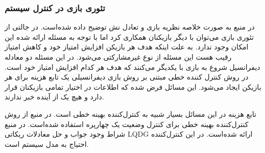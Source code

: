 \subsubsection{تئوری بازی در کنترل سیستم}
در منبع \cite{article1} به صورت خلاصه نظریه بازی و تعادل نش توضیح داده شده‌است. در جالتی از تئوری بازی می‌توان با دیگر بازیکنان همکاری کرد اما با توجه به مسئله ارائه شده این امکان وجود ندارد. به علت اینکه هدف هر بازیکن افزایش امتیاز خود و کاهش امتیاز رقیب هست این مسئله از نوع غیرمشارکتی می‌شود. در این مسئله دو معادله دیفرانسیل شروع به بازی با یکدیگر می‌کنند که هدف هر کدام افزایش امتیاز خود است. در روش کنترل کننده خطی مبتنی بر روش بازی دیفرانسیلی یک تابع هزینه برای هر بازیکن ایجاد می‌شود. این مسائل فرض شده که اطلاعات در اختیار تمامی بازیکنان قرار دارد و هیچ یک از آینده خبر ندارند.

تابع هزینه در این مسائل بسیار شبیه به کنترل‌کننده بهینه خطی است. در منبع \cite{4399042} از روش کنترل‌کننده بهینه خطی برای کنترل وضعیت یک چهارپره استفاده شده‌است. در منبع \cite{article2} شراط وجود جواب و حل معادلات ریکاتی  LQDG ارائه شده‌است. در این کنترل‌کننده احتیاج به مدل سیستم است.
